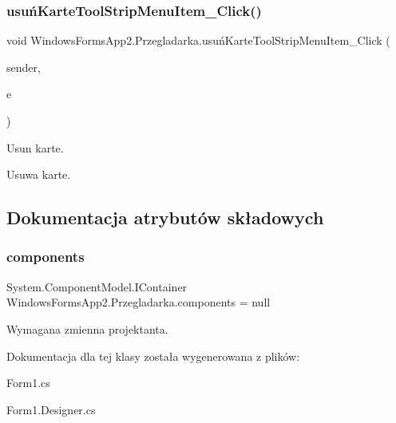\subsubsection{\texorpdfstring{usuń\+Karte\+Tool\+Strip\+Menu\+Item\+\_\+\+Click()}{usuńKarteToolStripMenuItem\_Click()}}
{\footnotesize\ttfamily void Windows\+Forms\+App2.\+Przegladarka.\+usuń\+Karte\+Tool\+Strip\+Menu\+Item\+\_\+\+Click (\begin{DoxyParamCaption}\item[{object}]{sender,  }\item[{Event\+Args}]{e }\end{DoxyParamCaption})\hspace{0.3cm}{\ttfamily [private]}}

Usun karte.

Usuwa karte. 

\subsection{Dokumentacja atrybutów składowych}
\mbox{\label{class_windows_forms_app2_1_1_przegladarka_a37fd573e6d383f202dbea9da1940a947}} 
\subsubsection{\texorpdfstring{components}{components}}
{\footnotesize\ttfamily System.\+Component\+Model.\+I\+Container Windows\+Forms\+App2.\+Przegladarka.\+components = null\hspace{0.3cm}{\ttfamily [private]}}



Wymagana zmienna projektanta. 



Dokumentacja dla tej klasy została wygenerowana z plików\+:\begin{DoxyCompactItemize}
\item 
Form1.\+cs\item 
Form1.\+Designer.\+cs\end{DoxyCompactItemize}
